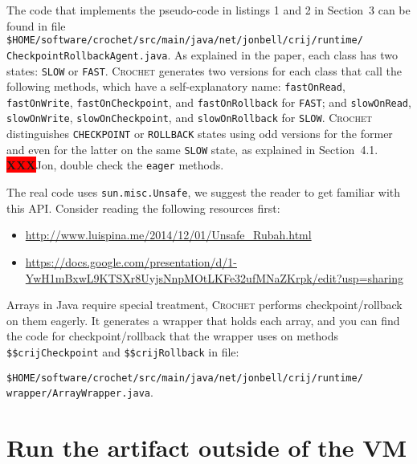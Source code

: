 \documentclass[12pt]{article}
\newcommand{\vm}[1]{\colorbox{green!20}{\texttt{\color{black}#1}}}
\newcommand{\XXX}{\colorbox{red}{\bf\color{white}XXX}}
\newcommand{\sysname}{\textsc{Crochet}\xspace}
\begin{document}
The code that implements the pseudo-code in listings 1 and 2 in Section~3 can be
found in file\\
\vm{\$HOME/software/crochet/src/main/java/net/jonbell/crij/runtime/}\\\vm{CheckpointRollbackAgent.java}.
As explained in the paper, each class has two states:  \texttt{SLOW} or
\texttt{FAST}.  \sysname generates two versions for each class that call the
following methods, which have a self-explanatory name: \texttt{fastOnRead},
\texttt{fastOnWrite}, \texttt{fastOnCheckpoint}, and \texttt{fastOnRollback} for
\texttt{FAST}; and \texttt{slowOnRead}, \texttt{slowOnWrite},
\texttt{slowOnCheckpoint}, and \texttt{slowOnRollback} for \texttt{SLOW}.
\sysname distinguishes \texttt{CHECKPOINT} or \texttt{ROLLBACK} states using
odd versions for the former and even for the latter on the same \texttt{SLOW}
state, as explained in Section~4.1. \XXX Jon, double check the \texttt{eager}
methods.

The real code uses \texttt{sun.misc.Unsafe}, we suggest the reader to get
familiar with this API.  Consider reading the following resources first:

\begin{itemize}

    \item \url{http://www.luispina.me/2014/12/01/Unsafe_Rubah.html}

    \item \href{https://docs.google.com/presentation/d/1-YwH1mBxwL9KTSXr8UyjsNnpMOtLKFe32ufMNaZKrpk/edit?usp=sharing}{https://docs.google.com/presentation/d/1-\\YwH1mBxwL9KTSXr8UyjsNnpMOtLKFe32ufMNaZKrpk/edit?usp=sharing}

\end{itemize}

Arrays in Java require special treatment, \sysname performs checkpoint/rollback
on them eagerly.  It generates a wrapper that holds each array, and you can find
the code for checkpoint/rollback that the wrapper uses on methods
\texttt{\$\$crijCheckpoint} and \texttt{\$\$crijRollback} in file:

\vm{\$HOME/software/crochet/src/main/java/net/jonbell/crij/runtime/}\\\vm{wrapper/ArrayWrapper.java}.

\section{Run the artifact outside of the VM}
\label{sec:extract}
\label{sec:last}
\end{document}
